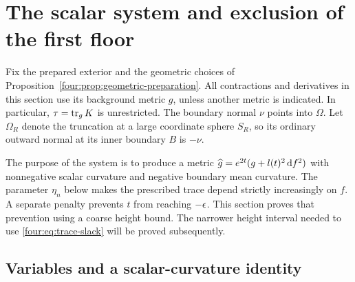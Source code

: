 \section{The scalar system and exclusion of the first floor}
\label{four:sec:system}

Fix the prepared exterior and the geometric choices of
Proposition~\ref{four:prop:geometric-preparation}.  All contractions and
derivatives in this section use its background metric $g$, unless another
metric is indicated.  In particular, $\tau=\operatorname{tr}_gK$ is unrestricted.
The boundary normal $\nu$ points into $\Omega$.  Let $\Omega_R$ denote
the truncation at a large coordinate sphere $S_R$, so its ordinary outward
normal at its inner boundary $B$ is $-\nu$.

The purpose of the system is to produce a metric
$\widehat g=e^{2t}(g+l(t)^2\,\mathrm d f^2)$ with nonnegative scalar curvature and
negative boundary mean curvature.  The parameter $\eta_n$ below makes
the prescribed trace depend strictly increasingly on $f$.  A separate penalty prevents
$t$ from reaching $-\epsilon$.  This section proves that prevention using a
coarse height bound.  The narrower height interval needed to use
\eqref{four:eq:trace-slack} will be proved subsequently.

\subsection{Variables and a scalar-curvature identity}

